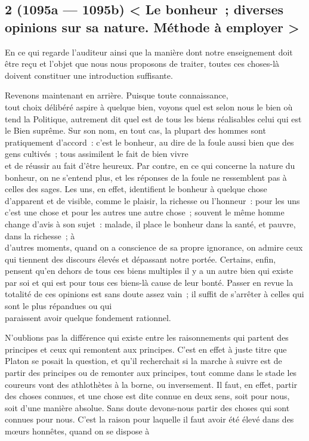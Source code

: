 \documentclass[french,twoside]{book} %
\begin{document}
\subsection[{2 (1095a — 1095b) < Le bonheur ; diverses opinions sur sa nature. Méthode à employer >}]{2 (1095a — 1095b) < Le bonheur ; diverses opinions sur sa nature. Méthode à employer >}
\noindent En ce qui regarde l’auditeur ainsi que la manière dont notre enseignement doit être reçu et l’objet que nous nous proposons de traiter, toutes ces choses-là doivent constituer une introduction suffisante.\par
Revenons maintenant en arrière. Puisque toute connaissance, \\
tout choix délibéré aspire à quelque bien, voyons quel est selon nous le bien où tend la Politique, autrement dit quel est de tous les biens réalisables celui qui est le Bien suprême. Sur son nom, en tout cas, la plupart des hommes sont pratiquement d’accord : c’est le bonheur, au dire de la foule aussi bien que des gens cultivés ; tous assimilent le fait de bien vivre \\
et de réussir au fait d’être heureux. Par contre, en ce qui concerne la nature du bonheur, on ne s’entend plus, et les réponses de la foule ne ressemblent pas à celles des sages. Les uns, en effet, identifient le bonheur à quelque chose d’apparent et de visible, comme le plaisir, la richesse ou l’honneur : pour les uns c’est une chose et pour les autres une autre chose ; souvent le même homme change d’avis à son sujet : malade, il place le bonheur dans la santé, et pauvre, dans la richesse ; à \\
d’autres moments, quand on a conscience de sa propre ignorance, on admire ceux qui tiennent des discours élevés et dépassant notre portée. Certains, enfin, pensent qu’en dehors de tous ces biens multiples il y a un autre bien qui existe par soi et qui est pour tous ces biens-là cause de leur bonté. Passer en revue la totalité de ces opinions est sans doute assez vain ; il suffit de s’arrêter à celles qui sont le plus répandues ou qui \\
paraissent avoir quelque fondement rationnel.\par
N’oublions pas la différence qui existe entre les raisonnements qui partent des principes et ceux qui remontent aux principes. C’est en effet à juste titre que Platon se posait la question, et qu’il recherchait si la marche à suivre est de partir des principes ou de remonter aux principes, tout comme dans  le stade les coureurs vont des athlothètes à la borne, ou inversement. Il faut, en effet, partir des choses connues, et une chose est dite connue en deux sens, soit pour nous, soit d’une manière absolue. Sans doute devons-nous partir des choses qui sont connues pour nous. C’est la raison pour laquelle il faut avoir été élevé dans des mœurs honnêtes, quand on se dispose à \\
\end{document}
